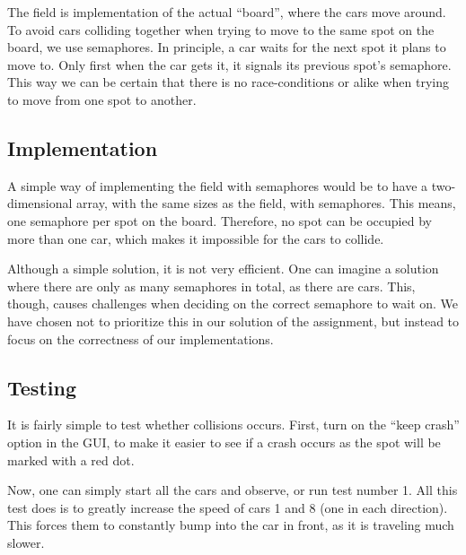 
The field is implementation of the actual ``board'', where the cars move
around. To avoid cars colliding together when trying to move to the
same spot on the board, we use semaphores. In principle, a car waits
for the next spot it plans to move to. Only first when the car gets
it, it signals its previous spot's semaphore. This way we can be
certain that there is no race-conditions or alike when trying to move
from one spot to another.


\subsection{Implementation}
\label{sub:field-impl}
A simple way of implementing the field with semaphores would be to
have a two-dimensional array, with the same sizes as the field, with
semaphores. This means, one semaphore per spot on the
board. Therefore, no spot can be occupied by more than one car, which
makes it impossible for the cars to collide.

Although a simple solution, it is not very efficient. One can imagine
a solution where there are only as many semaphores in total, as there
are cars. This, though, causes challenges when deciding on the
correct semaphore to wait on. We have chosen not to
prioritize this in our solution of the assignment, but instead to focus on the correctness of our implementations.


\subsection{Testing}
\label{sub:field-test}
It is fairly simple to test whether collisions occurs. First, turn on
the ``keep crash'' option in the GUI, to make it easier to see if a
crash occurs as the spot will be marked with a red dot.

Now, one can simply start all the cars and observe, or run test number
1. All this test does is to greatly increase the speed of cars 1 and 8
(one in each direction). This forces them to constantly bump into the
car in front, as it is traveling much slower.
